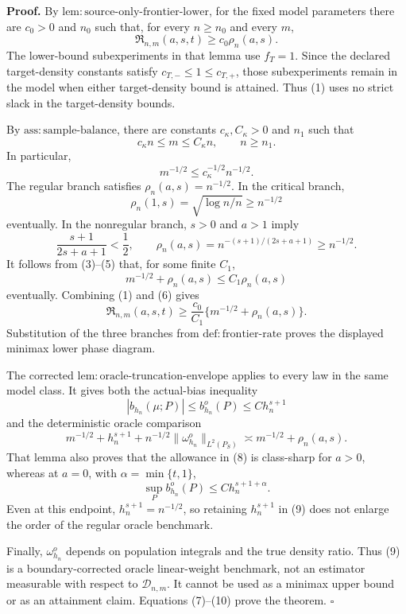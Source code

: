 \textbf{Proof.}
By \(\mathrm{lem:source\text{-}only\text{-}frontier\text{-}lower}\), for the fixed model parameters there are \(c_0>0\) and \(n_0\) such that, for every \(n\ge n_0\) and every \(m\),
\[
\mathfrak R_{n,m}(a,s,t)\ge c_0\rho_n(a,s).
\tag{1}
\]
The lower-bound subexperiments in that lemma use \(f_T=1\). Since the declared target-density constants satisfy \(c_{T,-}\le1\le c_{T,+}\), those subexperiments remain in the model when either target-density bound is attained. Thus (1) uses no strict slack in the target-density bounds.

By \(\mathrm{ass:sample\text{-}balance}\), there are constants \(c_\kappa,C_\kappa>0\) and \(n_1\) such that
\[
c_\kappa n\le m\le C_\kappa n,
\qquad n\ge n_1.
\tag{2}
\]
In particular,
\[
m^{-1/2}\le c_\kappa^{-1/2}n^{-1/2}.
\tag{3}
\]
The regular branch satisfies \(\rho_n(a,s)=n^{-1/2}\). In the critical branch,
\[
\rho_n(1,s)=\sqrt{\log n/n}\ge n^{-1/2}
\tag{4}
\]
eventually. In the nonregular branch, \(s>0\) and \(a>1\) imply
\[
\frac{s+1}{2s+a+1}<\frac12,
\qquad
\rho_n(a,s)=n^{-(s+1)/(2s+a+1)}\ge n^{-1/2}.
\tag{5}
\]
It follows from (3)--(5) that, for some finite \(C_1\),
\[
m^{-1/2}+\rho_n(a,s)\le C_1\rho_n(a,s)
\tag{6}
\]
eventually. Combining (1) and (6) gives
\[
\mathfrak R_{n,m}(a,s,t)
\ge \frac{c_0}{C_1}\{m^{-1/2}+\rho_n(a,s)\}.
\tag{7}
\]
Substitution of the three branches from \(\mathrm{def:frontier\text{-}rate}\) proves the displayed minimax lower phase diagram.

The corrected \(\mathrm{lem:oracle\text{-}truncation\text{-}envelope}\) applies to every law in the same model class. It gives both the actual-bias inequality
\[
|b_{h_n}(\mu;P)|\le b_{h_n}^o(P)\le Ch_n^{s+1}
\tag{8}
\]
and the deterministic oracle comparison
\[
m^{-1/2}+h_n^{s+1}
+n^{-1/2}\|\omega_{h_n}^o\|_{L^2(P_S)}
\asymp m^{-1/2}+\rho_n(a,s).
\tag{9}
\]
That lemma also proves that the allowance in (8) is class-sharp for \(a>0\), whereas at \(a=0\), with \(\alpha=\min\{t,1\}\),
\[
\sup_P b_{h_n}^o(P)\le C h_n^{s+1+\alpha}.
\tag{10}
\]
Even at this endpoint, \(h_n^{s+1}=n^{-1/2}\), so retaining \(h_n^{s+1}\) in (9) does not enlarge the order of the regular oracle benchmark.

Finally, \(\omega_{h_n}^o\) depends on population integrals and the true density ratio. Thus (9) is a boundary-corrected oracle linear-weight benchmark, not an estimator measurable with respect to \(\mathcal D_{n,m}\). It cannot be used as a minimax upper bound or as an attainment claim. Equations (7)--(10) prove the theorem. \(\square\)